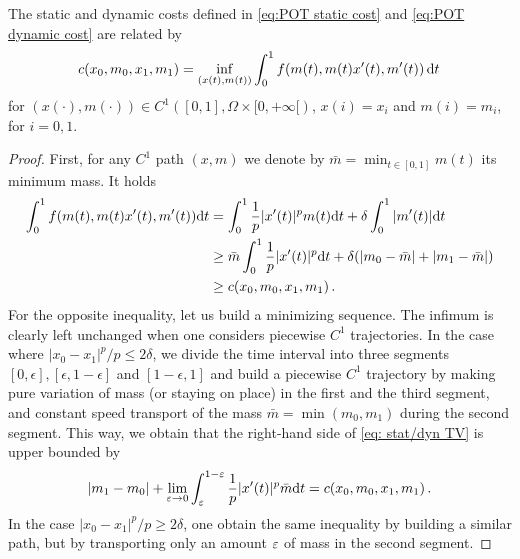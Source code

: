 \begin{proposition}
The static and dynamic costs defined in \eqref{eq:POT static cost} and \eqref{eq:POT dynamic cost} are related by
\begin{equation}\label{eq: stat/dyn TV}
	c (x_0,m_0,x_1,m_1) =
	\inf_{ (x(t),m(t))}  \int_0^1 f(m(t),m(t) x'(t),m'(t)) \, \mathrm{d} t\,
\end{equation}
for $(x(\cdot),m(\cdot)) \in C^1([0,1],\Omega \times [0,+\infty[)$, $x(i) = x_i$ and $m(i)=m_i$, for $i= 0,1$.
\end{proposition}

\begin{proof}
First, for any $C^1$ path $(x,m)$ we denote by $\bar{m} = \min_{t\in [0,1]} m(t)$ its minimum mass. It holds
\begin{align*}
\int_0^1 f(m(t),m(t)x'(t),m'(t)) \mathrm{d} t &= \int_0^1 \frac1p |x'(t)|^p m(t) \mathrm{d} t + \delta \int_0^1 |m'(t)| \mathrm{d} t \\
&\geq \bar{m}  \int_0^1 \frac1p |x'(t)|^p\mathrm{d} t + \delta (|m_0-\bar{m} | + |m_1-\bar{m}| ) \\
& \geq c(x_0,m_0,x_1,m_1) \, .
\end{align*}
For the opposite inequality, let us build a minimizing sequence. The infimum is clearly left unchanged when one considers piecewise $C^1$ trajectories. In the case where $|x_0-x_1|^p/p \leq 2\delta$, we divide the time interval into three segments $[0,\epsilon], [\epsilon, 1-\epsilon]$ and $[1-\epsilon, 1]$ and build a piecewise $C^1$ trajectory by making pure variation of mass (or staying on place) in the first and the third segment, and constant speed transport of the mass $\bar{m} = \min(m_0,m_1)$ during the second segment. This way, we obtain that the right-hand side of \eqref{eq: stat/dyn TV} is upper bounded by
\[
|m_1-m_0| + \lim_{\varepsilon \to 0}  \int_\varepsilon^{1-\varepsilon} \frac1p |x'(t)|^p\bar{m} \mathrm{d} t = c(x_0,m_0,x_1,m_1)\, .
\]
In the case $|x_0-x_1|^p/p \geq 2\delta$, one obtain the same inequality by building a similar path, but by transporting only an amount $\varepsilon$ of mass in the second segment. 
\end{proof}

